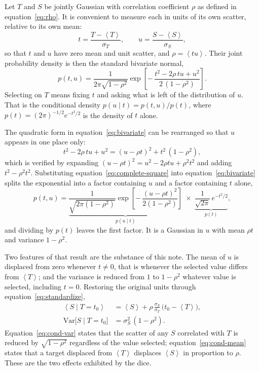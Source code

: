 \documentclass[12pt]{article}
\newcommand{\avg}[1]{\left\langle #1 \right\rangle}
\newcommand{\Var}{\mathrm{Var}}
\begin{document}
Let $T$ and $S$ be jointly Gaussian with correlation coefficient $\rho$ as
defined in equation~\eqref{eq:rho}.  It is convenient to measure each in units
of its own scatter, relative to its own mean:
\begin{equation}
  t = \frac{T - \avg{T}}{\sigma_T}, \qquad
  u = \frac{S - \avg{S}}{\sigma_S},
  \label{eq:standardize}
\end{equation}
so that $t$ and $u$ have zero mean and unit scatter, and $\rho = \avg{tu}$.
Their joint probability density is then the standard bivariate normal,
\begin{equation}
  p(t, u) = \frac{1}{2\pi\sqrt{1-\rho^{2}}}
            \exp\left[-\,\frac{t^{2} - 2\rho\,t u + u^{2}}
                              {2\,(1-\rho^{2})}\right].
  \label{eq:bivariate}
\end{equation}
Selecting on $T$ means fixing $t$ and asking what is left of the distribution of
$u$.  That is the conditional density $p(u \mid t) = p(t,u)/p(t)$, where
$p(t) = (2\pi)^{-1/2} e^{-t^{2}/2}$ is the density of $t$ alone.

The quadratic form in equation~\eqref{eq:bivariate} can be rearranged so that
$u$ appears in one place only:
\begin{equation}
  t^{2} - 2\rho\, t u + u^{2}
    = (u - \rho t)^{2} + t^{2}\,(1 - \rho^{2}),
  \label{eq:complete-square}
\end{equation}
which is verified by expanding $(u - \rho t)^{2} = u^{2} - 2\rho t u +
\rho^{2}t^{2}$ and adding $t^{2} - \rho^{2}t^{2}$.  Substituting
equation~\eqref{eq:complete-square} into equation~\eqref{eq:bivariate} splits
the exponential into a factor containing $u$ and a factor containing $t$ alone,
\begin{equation}
  p(t, u) = \underbrace{\frac{1}{\sqrt{2\pi(1-\rho^{2})}}
            \exp\left[-\,\frac{(u - \rho t)^{2}}{2(1-\rho^{2})}\right]}
            _{\textstyle p(u \mid t)}
            \;\times\;
            \underbrace{\frac{1}{\sqrt{2\pi}}\,e^{-t^{2}/2}}_{\textstyle p(t)} ,
\end{equation}
and dividing by $p(t)$ leaves the first factor.  It is a Gaussian in $u$ with
mean $\rho t$ and variance $1 - \rho^{2}$.

Two features of that result are the substance of this note.  The mean of $u$ is
displaced from zero whenever $t \neq 0$, that is whenever the selected value
differs from $\avg{T}$; and the variance is reduced from $1$ to $1-\rho^{2}$
whatever value is selected, including $t = 0$.  Restoring the original units
through equation~\eqref{eq:standardize},
\begin{align}
  \avg{S \mid T = t_0} &= \avg{S}
      + \rho\, \frac{\sigma_S}{\sigma_T}\,\bigl(t_0 - \avg{T}\bigr),
      \label{eq:cond-mean}\\[2pt]
  \Var\bigl[S \mid T = t_0\bigr] &= \sigma_S^{2}\,(1 - \rho^{2}).
      \label{eq:cond-var}
\end{align}
Equation~\eqref{eq:cond-var} states that the scatter of any $S$ correlated with
$T$ is reduced by $\sqrt{1-\rho^2}$ regardless of the value selected;
equation~\eqref{eq:cond-mean} states that a target displaced from $\avg{T}$
displaces $\avg{S}$ in proportion to $\rho$.  These are the two effects
exhibited by the dice.
\end{document}
